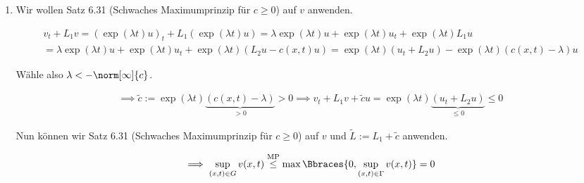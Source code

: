 
\begin{solution}

\phantom{}

\begin{enumerate}[label = (\roman*)]

  \item Wir wollen Satz 6.31 (Schwaches Maximumprinzip für $c \geq 0$) auf $v$ anwenden.


  \begin{multline*}
    v_t + L_1 v
    =
    (\exp(\lambda t) u)_t + L_1 (\exp(\lambda t) u)
    =
    \lambda \exp(\lambda t) u + \exp(\lambda t) u_t
    +
    \exp(\lambda t) L_1 u \\
    =
    \lambda \exp(\lambda t) u + \exp(\lambda t) u_t
    +
    \exp(\lambda t) (L_2 u - c(x, t) u)
    =
    \exp(\lambda t) (u_t +  L_2 u)
    -
    \exp(\lambda t) (c(x, t) - \lambda) u
  \end{multline*}

  Wähle also $\lambda < -\norm[\infty]{c}$.

  \begin{align*}
    \implies
    \tilde{c}
    :=
    \exp(\lambda t)
    \underbrace
    {
      (c(x, t) - \lambda)
    }_{
      > 0
    }
    >
    0
    \implies
    v_t + L_1 v + \tilde{c} u
    =
    \exp(\lambda t)
    \underbrace
    {
      (u_t +  L_2 u)
    }_{
      \leq 0
    }
    \leq
    0
  \end{align*}

  Nun können wir Satz 6.31 (Schwaches Maximumprinzip für $c \geq 0$) auf $v$ und $\tilde{L} := L_1 + \tilde{c}$ anwenden.

  \begin{align*}
    \implies
    \sup_{(x, t) \in G} v(x, t)
    \stackrel{\mathrm{MP}}{\leq}
    \max \Bbraces{0, \sup_{(x, t) \in \Gamma} v(x,t)}
    =
    0
  \end{align*}


\end{enumerate}
\end{solution}
